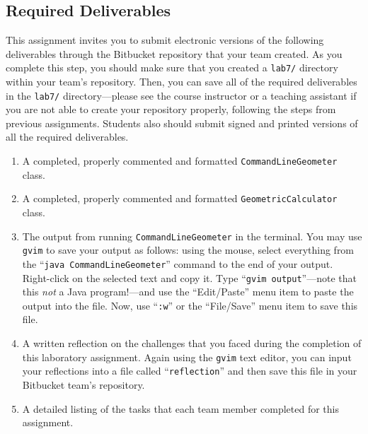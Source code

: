 \vspace*{-.1in}
\subsection*{Required Deliverables}
\vspace*{-.05in}

This assignment invites you to submit electronic versions of the following deliverables through the Bitbucket repository
that your team created.  As you complete this step, you should make sure that you created a {\tt lab7/} directory within
your team's repository.  Then, you can save all of the required deliverables in the {\tt lab7/} directory---please see
the course instructor or a teaching assistant if you are not able to create your repository properly, following the steps
from previous assignments. Students also should submit signed and printed versions of all the required deliverables.

\vspace*{-.05in}
\begin{enumerate}
    \setlength{\itemsep}{0pt}

  \item A completed, properly commented and formatted {\tt CommandLineGeometer} class.

  \item A completed, properly commented and formatted {\tt GeometricCalculator} class.

  \item The output from running {\tt CommandLineGeometer} in the terminal. You may use {\tt gvim} to save
    your output as follows: using the mouse, select everything from the ``{\tt java CommandLineGeometer}'' command
    to the end of your output.  Right-click on the selected text and copy it.  Type ``{\tt gvim output}''---note
    that this {\em not} a Java program!---and use the ``Edit/Paste'' menu item to paste the output into the file.
    Now, use ``{\tt :w}'' or the ``File/Save'' menu item to save this file.

  \item A written reflection on the challenges that you faced during the completion of this laboratory assignment.
    Again using the {\tt gvim} text editor, you can input your reflections into a file called ``{\tt reflection}''
    and then save this file in your Bitbucket team's repository.

  \item A detailed listing of the tasks that each team member completed for this assignment.

\end{enumerate}
\vspace*{-.1in}

